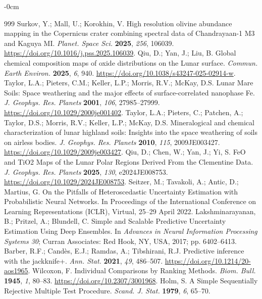 \documentclass[remotesensing,article,submit,pdftex,moreauthors]{Definitions/mdpi}
\begin{document}
\begin{adjustwidth}{-\extralength}{0cm}
\begin{thebibliography}{999}
Surkov, Y.; Mall, U.; Korokhin, V. High resolution olivine abundance mapping in the Copernicus crater combining spectral data of Chandrayaan-1 M3 and Kaguya MI. \emph{Planet. Space Sci.} {\bf 2025}, \emph{256}, 106039. \url{https://doi.org/10.1016/j.pss.2025.106039}.
Qiu, D.; Yan, J.; Liu, B. Global chemical composition maps of oxide distributions on the Lunar surface. \emph{Commun. Earth Environ.} {\bf 2025}, \emph{6}, 940. \url{https://doi.org/10.1038/s43247-025-02914-w}.
Taylor, L.A.; Pieters, C.M.; Keller, L.P.; Morris, R.V.; McKay, D.S. Lunar Mare Soils: Space weathering and the major effects of surface-correlated nanophase Fe. \emph{J. Geophys. Res. Planets} {\bf 2001}, \emph{106}, 27985--27999. \url{https://doi.org/10.1029/2000je001402}.
Taylor, L.A.; Pieters, C.; Patchen, A.; Taylor, D.S.; Morris, R.V.; Keller, L.P.; McKay, D.S. Mineralogical and chemical characterization of lunar highland soils: Insights into the space weathering of soils on airless bodies. \emph{J. Geophys. Res. Planets} {\bf 2010}, \emph{115}, 2009JE003427. \url{https://doi.org/10.1029/2009je003427}.
Qiu, D.; Chen, W.; Yan, J.; Yi, S. FeO and TiO2 Maps of the Lunar Polar Regions Derived From the Clementine Data. \emph{J. Geophys. Res. Planets} {\bf 2025}, \emph{130}, e2024JE008753. \url{https://doi.org/10.1029/2024JE008753}.
Seitzer, M.; Tavakoli, A.; Antic, D.; Martius, G. On the Pitfalls of Heteroscedastic Uncertainty Estimation with Probabilistic Neural Networks. In Proceedings of the International Conference on Learning Representations (ICLR), Virtual, 25--29 April 2022.
Lakshminarayanan, B.; Pritzel, A.; Blundell, C. Simple and Scalable Predictive Uncertainty Estimation Using Deep Ensembles. In \emph{Advances in Neural Information Processing Systems 30}; Curran Associates: Red Hook, NY, USA, 2017; pp. 6402--6413.
Barber, R.F.; Candès, E.J.; Ramdas, A.; Tibshirani, R.J. Predictive inference with the jackknife+. \emph{Ann. Stat.} {\bf 2021}, \emph{49}, 486--507. \url{https://doi.org/10.1214/20-aos1965}.
Wilcoxon, F. Individual Comparisons by Ranking Methods. \emph{Biom. Bull.} {\bf 1945}, \emph{1}, 80--83. \url{https://doi.org/10.2307/3001968}.
Holm, S. A Simple Sequentially Rejective Multiple Test Procedure. \emph{Scand. J. Stat.} {\bf 1979}, \emph{6}, 65--70.
\end{thebibliography}
\end{adjustwidth}
\end{document}
